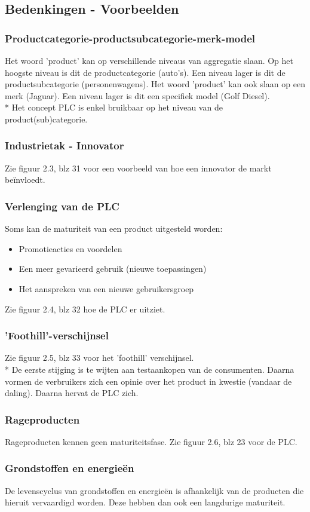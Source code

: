 \documentclass[12pt]{article}
\begin{document}
\subsection{Bedenkingen - Voorbeelden}
\subsubsection{Productcategorie-productsubcategorie-merk-model}
Het woord 'product' kan op verschillende niveaus van aggregatie slaan. Op het hoogste niveau is dit de productcategorie (auto's). Een niveau lager is dit de productsubcategorie (personenwagens). Het woord 'product' kan ook slaan op een merk (Jaguar). Een niveau lager is dit een specifiek model (Golf Diesel).\\*
Het concept PLC is enkel bruikbaar op het niveau van de product(sub)categorie.
\subsubsection{Industrietak - Innovator}
Zie figuur 2.3, blz 31 voor een voorbeeld van hoe een innovator de markt be\"invloedt.
\subsubsection{Verlenging van de PLC}
Soms kan de maturiteit van een product uitgesteld worden:
\begin{itemize}
\item Promotieacties en voordelen
\item Een meer gevarieerd gebruik (nieuwe toepassingen)
\item Het aanspreken van een nieuwe gebruikersgroep
\end{itemize}
Zie figuur 2.4, blz 32 hoe de PLC er uitziet.
\subsubsection{'Foothill'-verschijnsel}
Zie figuur 2.5, blz 33 voor het 'foothill' verschijnsel.\\*
De eerste stijging is te wijten aan testaankopen van de consumenten. Daarna vormen de verbruikers zich een opinie over het product in kwestie (vandaar de daling). Daarna hervat de PLC zich.
\subsubsection{Rageproducten}
Rageproducten kennen geen maturiteitsfase. Zie figuur 2.6, blz 23 voor de PLC.
\subsubsection{Grondstoffen en energie\"en}
De levenscyclus van grondstoffen en energie\"en is afhankelijk van de producten die hieruit vervaardigd worden. Deze hebben dan ook een langdurige maturiteit.
\end{document}
